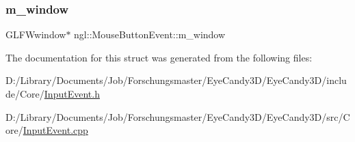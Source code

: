 \mbox{\label{structngl_1_1_mouse_button_event_ae292ba915083215131055f3a6c9b0d7f}} 
\subsubsection{\texorpdfstring{m\+\_\+window}{m\_window}}
{\footnotesize\ttfamily G\+L\+F\+Wwindow$\ast$ ngl\+::\+Mouse\+Button\+Event\+::m\+\_\+window}



The documentation for this struct was generated from the following files\+:\begin{DoxyCompactItemize}
\item 
D\+:/\+Library/\+Documents/\+Job/\+Forschungsmaster/\+Eye\+Candy3\+D/\+Eye\+Candy3\+D/include/\+Core/\mbox{\hyperlink{_input_event_8h}{Input\+Event.\+h}}\item 
D\+:/\+Library/\+Documents/\+Job/\+Forschungsmaster/\+Eye\+Candy3\+D/\+Eye\+Candy3\+D/src/\+Core/\mbox{\hyperlink{_input_event_8cpp}{Input\+Event.\+cpp}}\end{DoxyCompactItemize}
